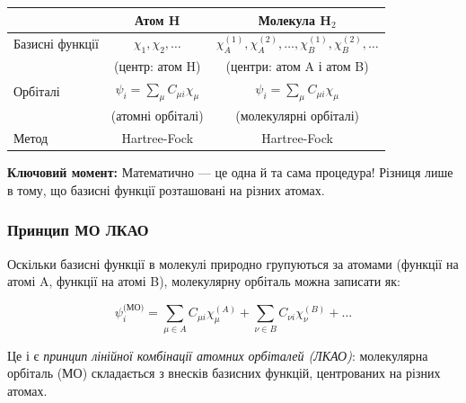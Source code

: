 \begin{center}
	\begin{tabular}{lcc}
		\toprule
		                & \textbf{Атом H}                        & \textbf{Молекула H$_2$}                                                  \\
		\midrule
		Базисні функції & $\chi_1, \chi_2, \ldots$               & $\chi_A^{(1)}, \chi_A^{(2)}, \ldots, \chi_B^{(1)}, \chi_B^{(2)}, \ldots$ \\
		                & (центр: атом H)                        & (центри: атом A і атом B)                                                \\
		\midrule
		Орбіталі        & $\psi_i = \sum_\mu C_{\mu i} \chi_\mu$ & $\psi_i = \sum_\mu C_{\mu i} \chi_\mu$                                   \\
		                & (атомні орбіталі)                      & (молекулярні орбіталі)                                                   \\
		\midrule
		Метод           & Hartree-Fock                           & Hartree-Fock                                                             \\
		\bottomrule
	\end{tabular}
\end{center}

\textbf{Ключовий момент:} Математично --- це одна й та сама процедура! Різниця лише в тому, що базисні функції розташовані на різних атомах.

\subsubsection{Принцип МО ЛКАО}

Оскільки базисні функції в молекулі природно групуються за атомами (функції на атомі A, функції на атомі B), молекулярну орбіталь можна записати як:

\begin{equation}
	\psi_i^{\text{(МО)}} = \sum_{\mu \in A} C_{\mu i} \chi_\mu^{(A)} + \sum_{\nu \in B} C_{\nu i} \chi_\nu^{(B)} + \ldots
\end{equation}

Це і є \emph{принцип лінійної комбінації атомних орбіталей (ЛКАО)}: молекулярна орбіталь (МО) складається з внесків базисних функцій, центрованих на різних атомах.

